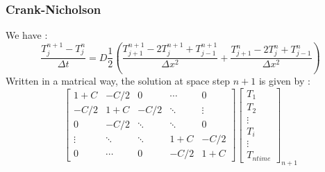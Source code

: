 \documentclass{article}
\begin{document}
                \subsubsection{Crank-Nicholson}
                    We have :
                    \begin{equation}
                        \frac{T_{j}^{n+1} - T_{j}^n}{\Delta t} = D\frac{1}{2} (\frac{T_{j+1}^{n+1}- 2T_{j}^{n+1} + T_{j-1}^{n+1}}{\Delta x^2}+\frac{T_{j+1}^{n}- 2T_{j}^{n} + T_{j-1}^{n}}{\Delta x^2})
                    \end{equation}
                    Written in a matrical way, the solution at space step $n+1$ is given by :
                    \begin{equation}
                        \begin{bmatrix}
                            1+C    & -C/2   & 0     & \cdots & 0 \\
                            -C/2   & 1+C    & -C/2   & \ddots & \vdots \\
                            0      & -C/2   & \ddots & \ddots & 0 \\
                            \vdots & \ddots & \ddots & 1+C   & -C/2\\
                            0      & \cdots & 0      & -C/2   & 1+C
                        \end{bmatrix}
                        \begin{bmatrix}
                            T_{1} \\
                            T_{2} \\
                            \vdots \\
                            T_{i} \\
                            \vdots \\
                            T_{ntime}
                        \end{bmatrix}_{n+1}
                    \end{equation}
\end{document}
